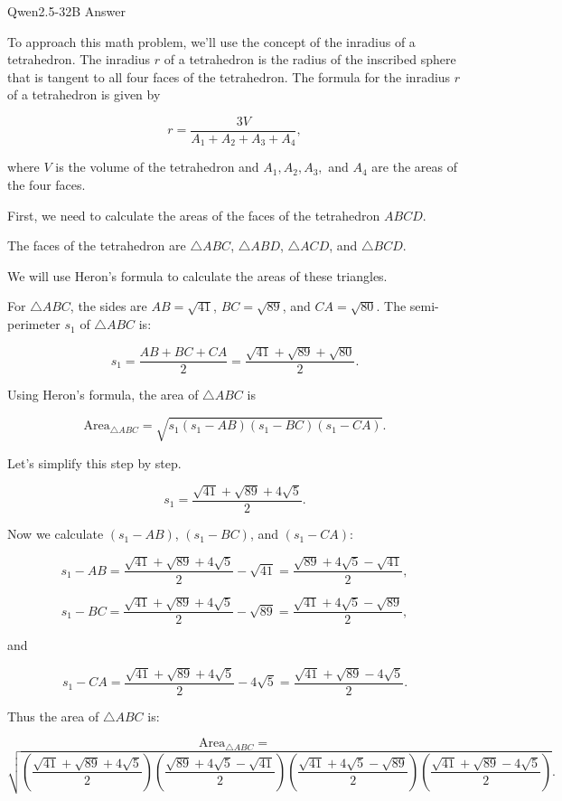\begin{answerbox}{Qwen2.5-32B Answer}

To approach this math problem, we'll use the concept of the inradius of a tetrahedron. The inradius $r$ of a tetrahedron is the radius of the inscribed sphere that is tangent to all four faces of the tetrahedron. The formula for the inradius $r$ of a tetrahedron is given by

\[ r = \frac{3V}{A_1 + A_2 + A_3 + A_4}, \]

where $V$ is the volume of the tetrahedron and $A_1, A_2, A_3,$ and $A_4$ are the areas of the four faces.

First, we need to calculate the areas of the faces of the tetrahedron $ABCD$.

The faces of the tetrahedron are $\triangle ABC$, $\triangle ABD$, $\triangle ACD$, and $\triangle BCD$.

We will use Heron's formula to calculate the areas of these triangles.

For $\triangle ABC$, the sides are $AB = \sqrt{41}$, $BC = \sqrt{89}$, and $CA = \sqrt{80}$. The semi-perimeter $s_1$ of $\triangle ABC$ is:

\[ s_1 = \frac{AB + BC + CA}{2} = \frac{\sqrt{41} + \sqrt{89} + \sqrt{80}}{2}. \]

Using Heron's formula, the area of $\triangle ABC$ is

\[ \text{Area}_{\triangle ABC} = \sqrt{s_1 (s_1 - AB)(s_1 - BC)(s_1 - CA)}. \]

Let's simplify this step by step.

\[ s_1 = \frac{\sqrt{41} + \sqrt{89} + 4\sqrt{5}}{2}. \]

Now we calculate $(s_1 - AB)$, $(s_1 - BC)$, and $(s_1 - CA)$:

\[ s_1 - AB = \frac{\sqrt{41} + \sqrt{89} + 4\sqrt{5}}{2} - \sqrt{41} = \frac{\sqrt{89} + 4 \sqrt{5} - \sqrt{41}}{2}, \]

\[ s_1 - BC = \frac{\sqrt{41} + \sqrt{89} + 4 \sqrt{5}}{2} - \sqrt{89} = \frac{\sqrt{41} + 4 \sqrt{5} - \sqrt{89}}{2}, \]

and

\[ s_1 - CA = \frac{\sqrt{41} + \sqrt{89} + 4 \sqrt{5}}{2} - 4 \sqrt{5} = \frac{\sqrt{41} + \sqrt{89} - 4 \sqrt{5}}{2}. \]

Thus the area of $\triangle ABC$ is:

\[ \text{Area}_{\triangle ABC} = \]
\[ \sqrt{\left(\frac{\sqrt{41} + \sqrt{89} + 4 \sqrt{5}}{2}\right) \left(\frac{\sqrt{89} + 4 \sqrt{5} - \sqrt{41}}{2}\right) \left(\frac{\sqrt{41} + 4 \sqrt{5} - \sqrt{89}}{2}\right) \left(\frac{\sqrt{41} + \sqrt{89} - 4 \sqrt{5}}{2}\right)}. \]


\end{answerbox}
